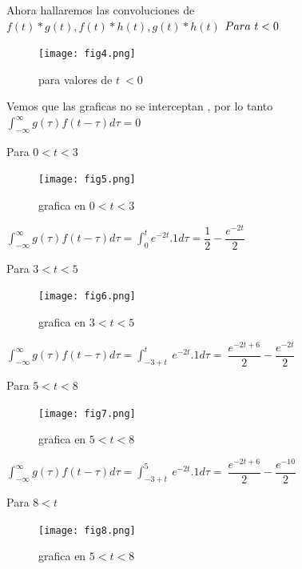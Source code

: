 \documentclass[11pt,a4paper]{article}
\begin{document}
{{\begin{enumerate}
Ahora hallaremos las convoluciones de \ $f(t)*g(t) ,f(t)*h(t) ,g(t)*h(t)$\newline \newline
{}
\newline$\\
Para  \ t<0$
\begin{figure}[H]
    \centering
    \texttt{[image: fig4.png]}
    \caption{para valores de $ t\ < 0$}
    \label{fig:my_label}
\end{figure}

Vemos que las graficas no se interceptan , por lo tanto $\int_{-\infty}^{\infty} g(\tau)f(t-\tau) d\tau = 0 $\newline


Para   $0 < t < 3$ \\
\begin{figure}[H]
    \centering
    \texttt{[image: fig5.png]}
    \caption{grafica en $0 < t < 3$ }
\end{figure}
$\int_{-\infty}^{\infty} g(\tau)f(t-\tau) d\tau = \int_{0}^{t} e^{-2t}.1 d\tau = \dfrac{1}{2}-\dfrac{e^{-2t}}{2}  $\\
\newpage


Para   $3 < t < 5$ \\
\begin{figure}[H]
    \centering
    \texttt{[image: fig6.png]}
    \caption{grafica en $3 < t < 5$ }
\end{figure}
$\int_{-\infty}^{\infty} g(\tau)f(t-\tau) d\tau = \int_{-3+t}^{t} \ e^{-2t}.1 d\tau = \ \dfrac{e^{-2t+6}}{2}-\dfrac{e^{-2t}}{2}  $\\
\newline
\newline


Para   $5 < t < 8$ \\
\begin{figure}[H]
    \centering
    \texttt{[image: fig7.png]}
    \caption{grafica en $5 < t < 8$ }
\end{figure}
$\int_{-\infty}^{\infty} g(\tau)f(t-\tau) d\tau = \int_{-3+t}^{5} \ e^{-2t}.1 d\tau = \ \dfrac{e^{-2t+6}}{2}-\dfrac{e^{-10}}{2}  $\\
\newpage



Para   $8 < t$ \\
\begin{figure}[H]
    \centering
    \texttt{[image: fig8.png]}
    \caption{grafica en $5 < t < 8$ }
\end{figure}


\end{enumerate}}}
\end{document}
